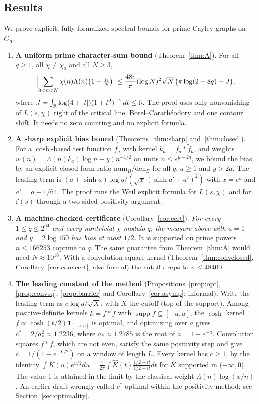 \subsection{Results}
We prove explicit, fully formalized spectral bounds for prime Cayley graphs on $G_q$.
\begin{enumerate}
\item \textbf{A uniform prime character-sum bound} (Theorem~\ref{thm:A}). For all $q\ge1$, all
  $\chi\ne\chi_0$ and all $N\ge3$,
  \[
    \Bigl\lvert\sum_{0<n<N}\chi(n)\Lambda(n)\bigl(1-\tfrac nN\bigr)\Bigr\rvert
    \le \frac{48e}{\pi}(\log N)^2\sqrt N\,\bigl(\pi\log(2+8q)+J\bigr),
  \]
  where $J=\int_{\mathbb{R}}\log(4+|t|)(1+t^2)^{-1}\,dt\le6$. The proof uses only nonvanishing of $L(s,\chi)$
  right of the critical line, Borel--Carath\'eodory and one contour shift. It needs no zero counting
  and no explicit formula.
\item \textbf{A sharp explicit bias bound} (Theorems~\ref{thm:sharp} and~\ref{thm:closed}). For a
  $\cosh$-based test function $f_a$ with kernel $k_a=f_a*\tilde f_a$, and weights
  $w(n)=\Lambda(n)k_a(\log n-y)n^{-1/2}$ on units $n\le e^{y+2a}$, we bound the bias by an explicit
  closed-form ratio $\mathrm{num}_B/\mathrm{den}_B$ for all $q$, $a\ge1$ and $y>2a$. The leading term
  is $(a+\sinh a)\log q/(\sqrt{x}\,(\sinh a'+a')^2)$ with $x=e^y$ and $a'=a-1/64$. The proof runs the
  Weil explicit formula for $L(s,\chi)$ and for $\zeta(s)$ through a two-sided positivity argument.
\item \textbf{A machine-checked certificate} (Corollary~\ref{cor:cert}). \emph{For every
  $1\le q\le2^{64}$ and every nontrivial $\chi$ modulo $q$, the measure above with $a=1$ and
  $y=2\log150$ has bias at most $1/2$.} It is supported on prime powers $n\le166253$ coprime to $q$.
  The same guarantee from Theorem~\ref{thm:A} would need $N\approx10^{16}$. With a convolution-square kernel
  (Theorem~\ref{thm:convclosed}, Corollary~\ref{cor:convcert}, also formal) the cutoff drops to $n\le48400$.
\item \textbf{The leading constant of the method} (Propositions~\ref{prop:opt}, \ref{prop:convsq}, \ref{prop:barrier}
  and Corollary~\ref{cor:asymp}; informal). Write the leading term as $c\log q/\sqrt X$, with $X$ the cutoff (top of the support).
  Among positive-definite kernels $k=f*\tilde f$ with $\operatorname{supp}f\subseteq[-a,a]$, the $\cosh$ kernel
  $f\propto\cosh(t/2)\mathbf 1_{[-a,a]}$ is optimal, and optimizing over $a$ gives $c^*=2/a_*^2\approx1.2236$, where
  $a_*\approx1.2785$ is the root of $a=1+e^{-a}$. Convolution squares $f*f$, which are not even, satisfy the same
  positivity step and give $c=1/(1-e^{-L/2})$ on a window of length $L$. Every kernel has $c\ge1$, by the identity
  $\int K(u)e^{u/2}du=\frac1{2\pi}\int\hat K(t)\frac{1/2+it}{1/2-it}dt$ for $K$ supported in $(-\infty,0]$. The value $1$
  is attained in the limit by the classical weight $\Lambda(n)\log(x/n)$. An earlier draft wrongly called $c^*$ optimal
  within the positivity method; see Section~\ref{sec:optimality}.
\end{enumerate}

